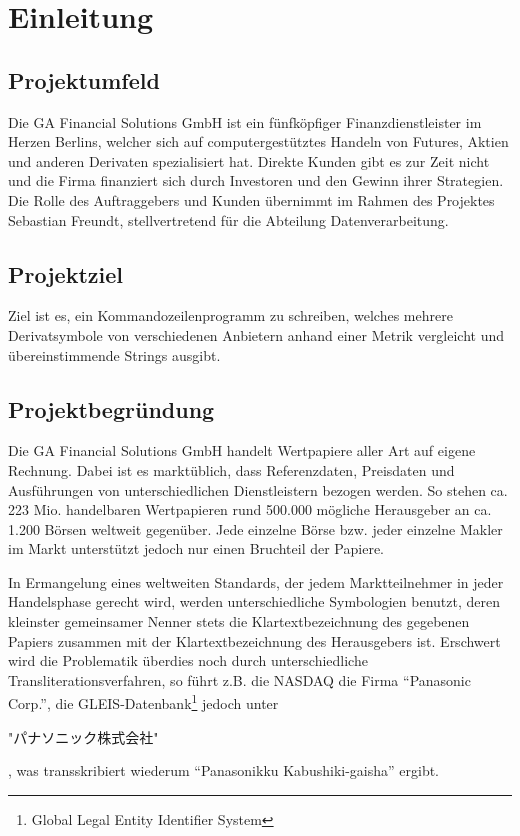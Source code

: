 \section{Einleitung}
\subsection{Projektumfeld}
Die GA Financial Solutions GmbH ist ein fünfköpfiger Finanzdienstleister im
Herzen Berlins, welcher sich auf computergestütztes Handeln
von Futures, Aktien und anderen Derivaten spezialisiert hat. Direkte Kunden gibt es zur Zeit
nicht und die Firma finanziert sich durch Investoren und den Gewinn ihrer
Strategien. Die Rolle des Auftraggebers und Kunden übernimmt im Rahmen des
Projektes Sebastian Freundt, stellvertretend für die Abteilung Datenverarbeitung.\par

\subsection{Projektziel}
Ziel ist es, ein Kommandozeilenprogramm zu schreiben, welches mehrere Derivatsymbole 
von verschiedenen Anbietern anhand einer Metrik vergleicht und übereinstimmende 
Strings ausgibt.\par

\subsection{Projektbegründung}
Die GA Financial Solutions GmbH handelt Wertpapiere aller Art auf eigene
Rechnung.  Dabei ist es marktüblich, dass Referenzdaten, Preisdaten
und Ausführungen von unterschiedlichen Dienstleistern bezogen werden.
So stehen ca. 223 Mio. handelbaren Wertpapieren rund 500.000 mögliche
Herausgeber an ca. 1.200 Börsen weltweit gegenüber.  Jede einzelne
Börse bzw. jeder einzelne Makler im Markt unterstützt jedoch nur
einen Bruchteil der Papiere.\par

In Ermangelung eines weltweiten Standards, der jedem Marktteilnehmer in
jeder Handelsphase gerecht wird, werden unterschiedliche Symbologien
benutzt, deren kleinster gemeinsamer Nenner stets die
Klartextbezeichnung des gegebenen Papiers zusammen mit der
Klartextbezeichnung des Herausgebers ist.  Erschwert wird die
Problematik überdies noch durch unterschiedliche Transliterationsverfahren,
so führt z.B. die NASDAQ die Firma "`Panasonic Corp."',
die GLEIS-Datenbank\footnote{Global Legal Entity Identifier System} jedoch unter
\begin{CJK}{UTF8}{min}
"パナソニック株式会社"
\end{CJK}%
, was transskribiert wiederum "`Panasonikku Kabushiki-gaisha"' ergibt. \par

